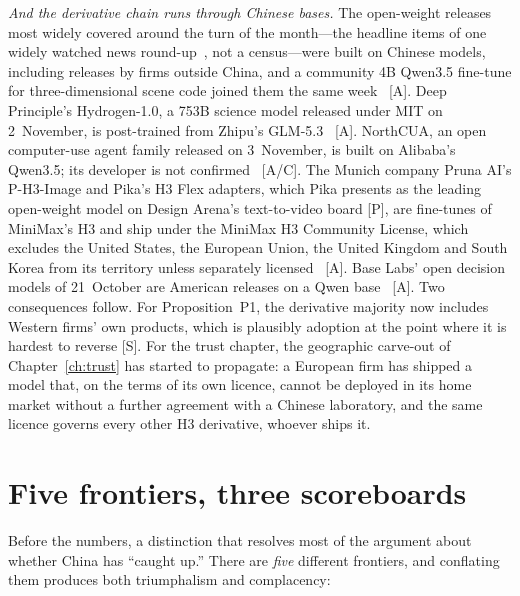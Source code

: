\emph{And the derivative chain runs through Chinese bases.} The open-weight releases most widely covered around the turn of the month---the headline items of one widely watched news round-up~\cite{lit-berman-nov}, not a census---were built on Chinese models, including releases by firms outside China, and a community 4B Qwen3.5 fine-tune for three-dimensional scene code joined them the same week~\cite{lit-berman-nov} [A]. Deep Principle's Hydrogen-1.0, a 753B science model released under MIT on 2~November, is post-trained from Zhipu's GLM-5.3~\cite{lit-hydrogen} [A]. NorthCUA, an open computer-use agent family released on 3~November, is built on Alibaba's Qwen3.5; its developer is not confirmed~\cite{lit-northcua} [A/C]. The Munich company Pruna AI's P-H3-Image and Pika's H3 Flex adapters, which Pika presents as the leading open-weight model on Design Arena's text-to-video board [P], are fine-tunes of MiniMax's H3 and ship under the MiniMax H3 Community License, which excludes the United States, the European Union, the United Kingdom and South Korea from its territory unless separately licensed~\cite{lit-pruna,lit-pika} [A]. Base Labs' open decision models of 21~October are American releases on a Qwen base~\cite{lit-us-open-tracker} [A]. Two consequences follow. For Proposition~P1, the derivative majority now includes Western firms' own products, which is plausibly adoption at the point where it is hardest to reverse [S]. For the trust chapter, the geographic carve-out of Chapter~\ref{ch:trust} has started to propagate: a European firm has shipped a model that, on the terms of its own licence, cannot be deployed in its home market without a further agreement with a Chinese laboratory, and the same licence governs every other H3 derivative, whoever ships it.

\section{Five frontiers, three scoreboards}
\label{sec:scoreboard}

Before the numbers, a distinction that resolves most of the argument about whether China has ``caught up.'' There are \emph{five} different frontiers, and conflating them produces both triumphalism and complacency:

